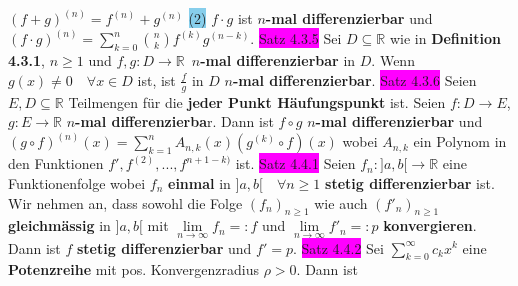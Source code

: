 \documentclass[landscape, 10pt]{article}
\newcommand{\R}{\mathbb{R}}
\begin{document}
\begin{multicols}{3}
                \textcolor{NavyBlue}{$(f+g)^{(n)}=f^{(n)}+g^{(n)}$}
         \colorbox{SkyBlue}{(2)} \textcolor{NavyBlue}{$f\cdot g$}
                ist $n$\textbf{-mal differenzierbar} 
                und \textcolor{NavyBlue}{
                $(f\cdot g)^{(n)}=\sum_{k=0}^n\binom{n}{k}f^{(k)}g^{(n-k)}$}. 
\colorbox{magenta}{Satz 4.3.5} Sei \textcolor{NavyBlue}{$D\subseteq\R$} wie in 
                \textbf{Definition 4.3.1}, 
                \textcolor{NavyBlue}{$n\geqslant1$} und 
                \textcolor{NavyBlue}{$f,g:D\longrightarrow\R$}\,
                \textbf{$n$-mal differenzierbar} in \textcolor{NavyBlue}{$D$}. Wenn 
         \textcolor{NavyBlue}{$g(x)\neq0\quad\forall x\in D$} ist, 
                ist \textcolor{NavyBlue}{$\frac{f}{g}$} 
                in \textcolor{NavyBlue}{$D$} $n$\textbf{-mal differenzierbar}. 
\colorbox{magenta}{Satz 4.3.6} Seien \textcolor{NavyBlue}{$E,D\subseteq\R$} Teilmengen 
                für die \textbf{jeder Punkt Häufungspunkt} ist. Seien 
                \textcolor{NavyBlue}{$f:D\longrightarrow E$},
                \textcolor{NavyBlue}{$g:E\longrightarrow\R$} 
         \textbf{$n$-mal differenzierba}r.
                Dann ist \textcolor{NavyBlue}{$f\circ g$} 
                $n$\textbf{-mal differenzierbar} und 
                \textcolor{NavyBlue}{
                $(g\circ f)^{(n)}(x)=\sum_{k=1}^nA_{n,k}(x)(g^{(k)}\circ f)(x)$}
         wobei \textcolor{NavyBlue}{$A_{n,k}$} ein Polynom in den Funktionen 
                \textcolor{NavyBlue}{$f',f^{(2)},...,f^{n+1-k)}$} ist. 
\colorbox{magenta}{Satz 4.4.1} Seien \textcolor{NavyBlue}{$f_n:]a,b[\longrightarrow\R$} 
                eine Funktionenfolge wobei \textcolor{NavyBlue}{$f_n$} \textbf{einmal} in 
                \textcolor{NavyBlue}{$]a,b[\quad\forall n\geqslant1$} 
                \textbf{stetig differenzierbar}
         ist.
                Wir nehmen an, dass sowohl die Folge \textcolor{NavyBlue}{$(f_n)_{n\geqslant1}$} 
                wie auch \textcolor{NavyBlue}{$(f'_n)_{n\geqslant1}$} 
                \textbf{gleichmässig} in \textcolor{NavyBlue}{$]a,b[$} mit 
                \textcolor{NavyBlue}{$\lim\limits_{n\to\infty}f_n=:f$} 
         und \textcolor{NavyBlue}{$\lim\limits_{n\to\infty}f'_n=:p$}
                \textbf{konvergieren}. Dann ist \textcolor{NavyBlue}{$f$}
                \textbf{stetig differenzierbar} 
                und \textcolor{NavyBlue}{$f'=p$}. 
\colorbox{magenta}{Satz 4.4.2} Sei \textcolor{NavyBlue}{$\sum_{k=0}^\infty c_kx^k$} 
                eine \textbf{Potenzreihe} mit 
                pos. Konvergenzradius \textcolor{NavyBlue}{$\rho>0$}. Dann ist

\end{multicols}
\end{document}
